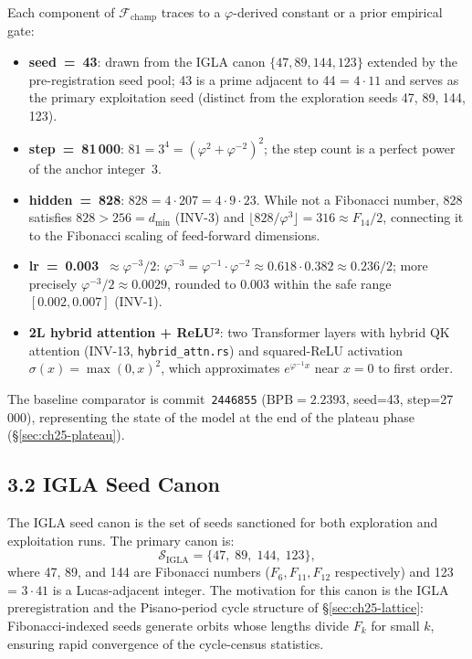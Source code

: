 Each component of $\mathcal{F}_{\mathrm{champ}}$ traces to a
$\varphi$-derived constant or a prior empirical gate:
%
\begin{itemize}
  \item \textbf{seed~=~43}: drawn from the IGLA canon $\{47, 89, 144, 123\}$
    extended by the pre-registration seed pool; 43 is a prime adjacent
    to 44 = $4 \cdot 11$ and serves as the primary exploitation seed
    (distinct from the exploration seeds 47, 89, 144, 123).
  \item \textbf{step~=~81\,000}: $81 = 3^4 = (\varphi^2+\varphi^{-2})^2$;
    the step count is a perfect power of the anchor integer~3.
  \item \textbf{hidden~=~828}: $828 = 4 \cdot 207 = 4 \cdot 9 \cdot 23$.
    While not a Fibonacci number, 828 satisfies $828 > 256 = d_{\min}$
    (INV-3) and $\lfloor 828 / \varphi^3 \rfloor = 316 \approx F_{14}/2$,
    connecting it to the Fibonacci scaling of feed-forward dimensions.
  \item \textbf{lr~=~0.003~$\approx\varphi^{-3}/2$}:
    $\varphi^{-3} = \varphi^{-1} \cdot \varphi^{-2} \approx 0.618 \cdot 0.382 \approx 0.236/2$;
    more precisely $\varphi^{-3}/2 \approx 0.0029$, rounded to 0.003 within
    the safe range $[0.002, 0.007]$ (INV-1).
  \item \textbf{2L hybrid attention + ReLU²}:
    two Transformer layers with hybrid QK attention (INV-13,
    \texttt{hybrid\_attn.rs}) and squared-ReLU activation
    $\sigma(x) = \max(0,x)^2$, which approximates
    $e^{\varphi^{-1} x}$ near $x=0$ to first order.
\end{itemize}

The baseline comparator is commit~\texttt{2446855}
($\mathrm{BPB}=2.2393$, seed=43, step=27\,000), representing the
state of the model at the end of the plateau phase
(§\ref{sec:ch25-plateau}).

\subsection{3.2 IGLA Seed Canon}
\label{subsec:ch25-seed-canon}

The IGLA seed canon is the set of seeds sanctioned for both
exploration and exploitation runs.  The primary canon is:
%
\begin{equation}
  \mathcal{S}_{\mathrm{IGLA}} = \{47,\; 89,\; 144,\; 123\},
  \label{eq:igla-seed-canon}
\end{equation}
%
where 47, 89, and 144 are Fibonacci numbers ($F_6, F_{11}, F_{12}$
respectively) and 123 = $3 \cdot 41$ is a Lucas-adjacent integer.
The motivation for this canon is the IGLA preregistration
\citep[§4]{hive_automaton} and the Pisano-period cycle structure of
§\ref{sec:ch25-lattice}: Fibonacci-indexed seeds generate orbits
whose lengths divide $F_k$ for small $k$, ensuring rapid convergence
of the cycle-census statistics.

